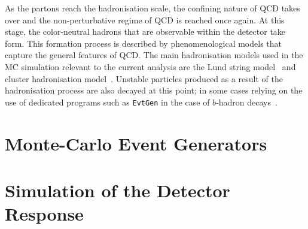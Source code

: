 As the partons reach the hadronisation scale, the confining nature of QCD takes over and the non-perturbative regime of QCD is reached
once again.
At this stage, the color-neutral hadrons that are observable within the detector take form.
This formation process is described by phenomenological models that capture the general
features of QCD.
The main hadronisation models used in the MC simulation relevant to the current analysis are the
Lund string model~\cite{Andersson:1983ia} and cluster hadronisation model~\cite{Webber:1983if}.
Unstable particles produced as a result of the hadronisation process are also decayed at this point;
in some cases relying on the use of dedicated programs such as \texttt{EvtGen} in the case of $b$-hadron decays~\cite{Lange:2001uf}.

\section{Monte-Carlo Event Generators}
\label{sec:mc_event_gen}

\section{Simulation of the Detector Response}
\label{sec:detector_sim}
